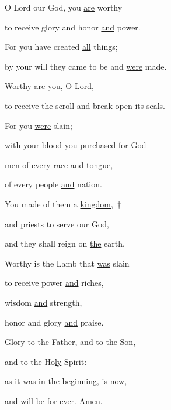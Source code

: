\noindent O Lord our God, you \uline{are} worthy ~\GreStar{}~\nopagebreak

to receive glory and honor \uline{and} power.

\noindent For you have created \uline{all} things; ~\GreStar{}~\nopagebreak

by your will they came to be and \uline{were} made.

\noindent Worthy are you, \uline{O} Lord, ~\GreStar{}~\nopagebreak

to receive the scroll and break open \uline{its} seals.

\noindent For you \uline{were} slain;~\GreStar{}~\nopagebreak

with your blood you purchased \uline{for} God

\noindent men of every race \uline{and} tongue,~\GreStar{}~\nopagebreak

of every people \uline{and} nation.

\noindent You made of them a \uline{kingdom},~†~\nopagebreak

and priests to serve \uline{our} God,~\GreStar{}~\nopagebreak

and they shall reign on \uline{the} earth.

\noindent Worthy is the Lamb that \uline{was} slain~\GreStar{}~\nopagebreak

to receive power \uline{and} riches,

\noindent wisdom \uline{and} strength, ~\GreStar{}~\nopagebreak

honor and glory \uline{and} praise.

\noindent Glory to the Father, and to \uline{the} Son,~\GreStar{}~\nopagebreak

and to the Ho\uline{ly} Spirit:

\noindent as it was in the beginning, \uline{is} now,~\GreStar{}~\nopagebreak

and will be for ever. \uline{A}men.

